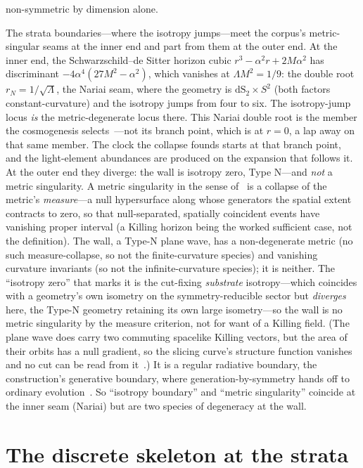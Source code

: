 \documentclass[11pt,a4paper]{article}
\theoremstyle{plain}
\theoremstyle{definition}
\theoremstyle{remark}
\newcommand{\dS}{\mathrm{dS}}
\begin{document}
non-symmetric by dimension alone.

The strata boundaries---where the isotropy jumps---meet the corpus's metric-singular seams at the inner end and part from them at the outer end. At the inner end, the Schwarzschild--de Sitter horizon cubic $r^3-\alpha^2 r+2M\alpha^2$ has discriminant $-4\alpha^4(27M^2-\alpha^2)$, which vanishes at $\Lambda M^2=1/9$: the double root $r_N=1/\sqrt\Lambda$, the Nariai seam, where the geometry is $\dS_2\times S^2$ (both factors constant-curvature) and the isotropy jumps from four to six. The isotropy-jump locus \emph{is} the metric-degenerate locus there. This Nariai double root is the member the cosmogenesis selects~\cite{JanzenCosmogenesis}---not its branch point, which is at $r=0$, a lap away on that same member. The clock the collapse founds starts at that branch point, and the light-element abundances are produced on the expansion that follows it. At the outer end they diverge: the wall is isotropy zero, Type N---and \emph{not} a metric singularity. A metric singularity in the sense of~\cite{JanzenBHcausality} is a collapse of the metric's \emph{measure}---a null hypersurface along whose generators the spatial extent contracts to zero, so that null-separated, spatially coincident events have vanishing proper interval (a Killing horizon being the worked sufficient case, not the definition). The wall, a Type-N plane wave, has a non-degenerate metric (no such measure-collapse, so not the finite-curvature species) and vanishing curvature invariants (so not the infinite-curvature species); it is neither. The ``isotropy zero'' that marks it is the cut-fixing \emph{substrate} isotropy---which coincides with a geometry's own isometry on the symmetry-reducible sector but \emph{diverges} here, the Type-N geometry retaining its own large isometry---so the wall is no metric singularity by the measure criterion, not for want of a Killing field. (The plane wave does carry two commuting spacelike Killing vectors, but the area of their orbits has a null gradient, so the slicing curve's structure function vanishes and no cut can be read from it~\cite{JanzenRange}.) It is a regular radiative boundary, the construction's generative boundary, where generation-by-symmetry hands off to ordinary evolution~\cite{JanzenRange}. So ``isotropy boundary'' and ``metric singularity'' coincide at the inner seam (Nariai) but are two species of degeneracy at the wall.

\section{The discrete skeleton at the strata}\label{sec:discrete}
\end{document}
